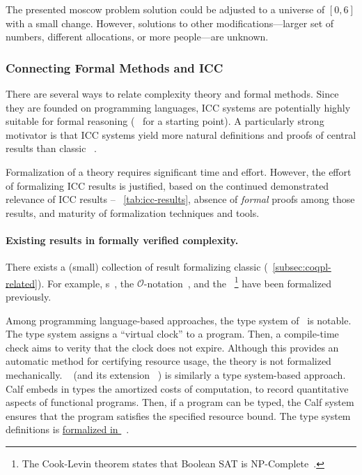 The presented moscow problem solution could be adjusted to a universe of \([0, 6]\) with a small change.
However, solutions to other modifications---\eg larger set of numbers, different allocations, or more people---are unknown.

\subsubsection{Connecting Formal Methods and ICC}
\label{subsubsec:icc-formally}

There are several ways to relate complexity theory and formal methods. Since
they are founded on programming languages, ICC systems are potentially highly
suitable for formal reasoning (\cf~\textcite{cpierce20222} for a starting
point). A particularly strong motivator is that ICC systems yield more natural
definitions and proofs of central results than classic ~\cite{kristiansen2017}.

Formalization of a theory requires significant time and effort.
However, the effort of formalizing ICC results is justified, based on the
continued demonstrated relevance of ICC results -- \cf~\autoref{tab:icc-results},
absence of \emph{formal} proofs among those results, and
maturity of formalization techniques and tools.

\paragraph*{Existing results in formally verified complexity.}
There exists a (small) collection of result formalizing classic  (\cf~\autoref{subsec:coqpl-related}). For example,
s~\cite{forster2020}, the
\(\mathcal{O}\)-notation~\cite{gueneau2018},
and the ~\cite{gaher2021}\footnote{
The Cook-Levin theorem states that Boolean SAT is NP-Complete~\cite{cook1971, levin1973}.}
have been formalized previously.

Among programming language-based approaches, the type system of~\cite{crary2000}
is notable. The type system assigns a \enquote{virtual clock} to a program.
Then, a compile-time check aims to verity that the clock does not expire.
Although this provides an automatic method for certifying resource usage, the
theory is not formalized mechanically. ~\cite{niu2022} (and its
extension ~\cite{grodin2024}) is similarly a type system-based
approach. Calf embeds in types the amortized costs of
computation, to record quantitative aspects of functional programs. Then, if a
program can be typed, the Calf system ensures that the program satisfies the
specified resource bound. The type system definitions is
\href{https://github.com/HarrisonGrodin/agda-calf}{formalized in
}~\cite{grodin2023}.

